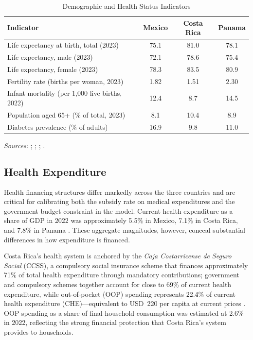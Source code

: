 \documentclass[12pt,a4paper]{article}
\begin{document}
\begin{table}[htbp]
\centering
\caption{Demographic and Health Status Indicators}
\label{tab:demog}
\begin{tabular}{lccc}
\hline\hline
\textbf{Indicator} & \textbf{Mexico} & \textbf{Costa Rica} & \textbf{Panama} \\
\hline
Life expectancy at birth, total (2023)           & 75.1 & 81.0 & 78.1 \\
Life expectancy, male (2023)                     & 72.1 & 78.6 & 75.4 \\
Life expectancy, female (2023)                   & 78.3 & 83.5 & 80.9 \\
Fertility rate (births per woman, 2023)          & 1.82 & 1.51 & 2.30 \\
Infant mortality (per 1{,}000 live births, 2022) & 12.4 & 8.7  & 14.5 \\
Population aged 65+ (\% of total, 2023)          & 8.1  & 10.4 & 8.9  \\
Diabetes prevalence (\% of adults)               & 16.9 & 9.8  & 11.0 \\
\hline\hline
\end{tabular}
\begin{minipage}{\linewidth}
\smallskip
\footnotesize
\textit{Sources:} \citet{PAHOHIA2024}; \citet{WHOGHO2024};
\citet{WorldBankWDI2024}; \citet{OECDHaG2023}.
\end{minipage}
\end{table}

\subsection{Health Expenditure}\label{subsec:health_exp}

Health financing structures differ markedly across the three countries
and are critical for calibrating both the subsidy rate on medical
expenditures and the government budget constraint in the model. Current
health expenditure as a share of GDP in 2022 was approximately 5.5\%
in Mexico, 7.1\% in Costa Rica, and 7.8\% in Panama \citep{WHOGHED2024}.
These aggregate magnitudes, however, conceal substantial differences in
how expenditure is financed.

Costa Rica's health system is anchored by the \textit{Caja
Costarricense de Seguro Social} (CCSS), a compulsory social insurance
scheme that finances approximately 71\% of total health expenditure
through mandatory contributions; government and compulsory schemes
together account for close to 69\% of current health expenditure, while
out-of-pocket (OOP) spending represents 22.4\% of current health
expenditure (CHE)---equivalent to USD~220 per capita at current prices
\citep{OECDHaG2023, WHOGHO2024}. OOP spending as a share of final
household consumption was estimated at 2.6\% in 2022, reflecting the
strong financial protection that Costa Rica's system provides to
households.
\end{document}

